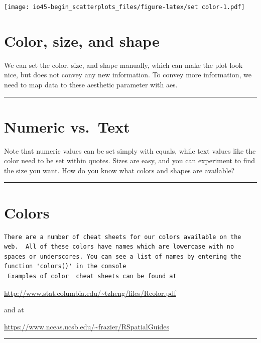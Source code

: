 \documentclass[
]{book}
\begin{document}
\texttt{[image: io45-begin\_scatterplots\_files/figure-latex/set color-1.pdf]}

\hypertarget{color-size-and-shape}{%
\chapter{Color, size, and shape}\label{color-size-and-shape}}

We can set the color, size, and shape manually, which can make the plot look nice, but does not convey any new information. To convey more information, we need to map data to these aesthetic parameter with aes.

\begin{center}\rule{0.5\linewidth}{0.5pt}\end{center}

\hypertarget{numeric-vs.-text}{%
\chapter{Numeric vs.~Text}\label{numeric-vs.-text}}

Note that numeric values can be set simply with equals, while text values like the color need to be set within quotes.
Sizes are easy, and you can experiment to find the size you want. How do you know what colors and shapes are available?

\begin{center}\rule{0.5\linewidth}{0.5pt}\end{center}

\hypertarget{colors}{%
\chapter{Colors}\label{colors}}

\begin{verbatim}
There are a number of cheat sheets for our colors available on the web.  All of these colors have names which are lowercase with no spaces or underscores. You can see a list of names by entering the function 'colors()' in the console
 Examples of color  cheat sheets can be found at 
\end{verbatim}

\url{http://www.stat.columbia.edu/~tzheng/files/Rcolor.pdf}

and at

\url{https://www.nceas.ucsb.edu/~frazier/RSpatialGuides}

\begin{center}\rule{0.5\linewidth}{0.5pt}\end{center}
\end{document}
